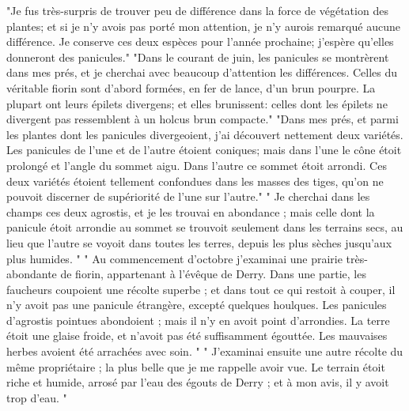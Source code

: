 "Je fus très-surpris de trouver peu de différence dans la force de végétation des plantes; et si je n'y avois pas porté mon attention, je n'y aurois remarqué aucune différence. Je conserve ces deux espèces pour l'année prochaine; j'espère qu'elles donneront des panicules."
"Dans le courant de juin, les panicules se montrèrent dans mes prés, et je cherchai avec beaucoup d'attention les différences. Celles du véritable fiorin sont d'abord formées, en fer de lance, d'un brun pourpre. La plupart ont leurs épilets divergens; et elles brunissent: celles dont les épilets ne divergent pas ressemblent à un holcus brun compacte."
"Dans mes prés, et parmi les plantes dont les panicules divergeoient, j'ai découvert nettement deux variétés. Les panicules de l'une et de l'autre étoient coniques; mais dans l'une le cône étoit prolongé et l'angle du sommet aigu. Dans l'autre ce sommet étoit arrondi. Ces deux variétés étoient tellement confondues dans les masses des tiges, qu'on\setcounter{page}{252} ne pouvoit discerner de supériorité de l’une sur l’autre."
" Je cherchai dans les champs ces deux agrostis, et je les trouvai en abondance ; mais celle dont la panicule étoit arrondie au sommet se trouvoit seulement dans les terrains secs, au lieu que l’autre se voyoit dans toutes les terres, depuis les plus sèches jusqu’aux plus humides. "
" Au commencement d’octobre j’examinai une prairie très-abondante de fiorin, appartenant à l’évêque de Derry. Dans une partie, les faucheurs coupoient une récolte superbe ; et dans tout ce qui restoit à couper, il n’y avoit pas une panicule étrangère, excepté quelques houlques. Les panicules d’agrostis pointues abondoient ; mais il n’y en avoit point d’arrondies. La terre étoit une glaise froide, et n’avoit pas été suffisamment égouttée. Les mauvaises herbes avoient été arrachées avec soin. "
" J’examinai ensuite une autre récolte du même propriétaire ; la plus belle que je me rappelle avoir vue. Le terrain étoit riche et humide, arrosé par l’eau des égouts de Derry ; et à mon avis, il y avoit trop d’eau. "
